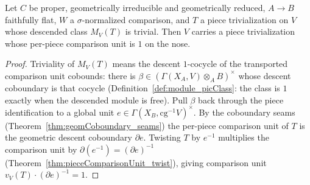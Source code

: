 \begin{theorem}
  \label{thm:exists_pieceComparisonUnit_eq_one}
  \leanok
  Let \(C\) be proper, geometrically irreducible and geometrically reduced, \(A \to B\) faithfully
  flat, \(W\) a \(\sigma\)-normalized comparison, and \(T\) a piece trivialization on \(V\) whose
  descended class \(M_V(T)\) is trivial. Then \(V\) carries a piece trivialization whose per-piece
  comparison unit is \(1\) on the nose.
\end{theorem}
\begin{proof}
  \leanok
  Triviality of \(M_V(T)\) means the descent \(1\)-cocycle of the transported comparison unit
  cobounds: there is \(\beta \in (\Gamma(X_A, V) \otimes_A B)^{\times}\) whose descent coboundary is
  that cocycle (Definition~\ref{def:module_picClass}: the class is \(1\) exactly when the descended
  module is free). Pull \(\beta\) back through the piece identification to a global unit \(e \in
  \Gamma(X_B, \mathrm{cg}^{-1}V)^{\times}\). By the coboundary seams
  (Theorem~\ref{thm:geomCoboundary_seams}) the per-piece comparison unit of \(T\) is the geometric
  descent coboundary \(\partial e\). Twisting \(T\) by \(e^{-1}\) multiplies the comparison unit by
  \(\partial(e^{-1}) = (\partial e)^{-1}\) (Theorem~\ref{thm:pieceComparisonUnit_twist}), giving
  comparison unit \(v_V(T) \cdot (\partial e)^{-1} = 1\).
\end{proof}

